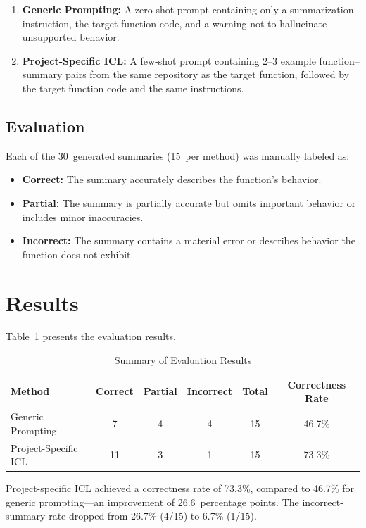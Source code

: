 \documentclass[conference]{IEEEtran}
\begin{document}
\begin{enumerate}
  \item \textbf{Generic Prompting:} A zero-shot prompt containing only a
    summarization instruction, the target function code, and a warning not to
    hallucinate unsupported behavior.
  \item \textbf{Project-Specific ICL:} A few-shot prompt containing 2--3
    example function--summary pairs from the same repository as the target
    function, followed by the target function code and the same instructions.
\end{enumerate}

\subsection{Evaluation}
Each of the 30~generated summaries (15~per method) was manually labeled as:
\begin{itemize}
  \item \textbf{Correct:} The summary accurately describes the function's
    behavior.
  \item \textbf{Partial:} The summary is partially accurate but omits
    important behavior or includes minor inaccuracies.
  \item \textbf{Incorrect:} The summary contains a material error or
    describes behavior the function does not exhibit.
\end{itemize}

\section{Results}
\label{sec:results}

Table~\ref{tab:result-summary} presents the evaluation results.

\begin{table}[ht]
\centering
\caption{Summary of Evaluation Results}
\label{tab:result-summary}
\begin{tabular}{lccccc}
\toprule
Method & Correct & Partial & Incorrect & Total & Correctness Rate \\
\midrule
Generic Prompting & 7 & 4 & 4 & 15 & 46.7\% \\
Project-Specific ICL & 11 & 3 & 1 & 15 & 73.3\% \\
\bottomrule
\end{tabular}
\end{table}

Project-specific ICL achieved a correctness rate of 73.3\%, compared to 46.7\%
for generic prompting---an improvement of 26.6~percentage points. The
incorrect-summary rate dropped from 26.7\% (4/15) to 6.7\% (1/15).
\end{document}
